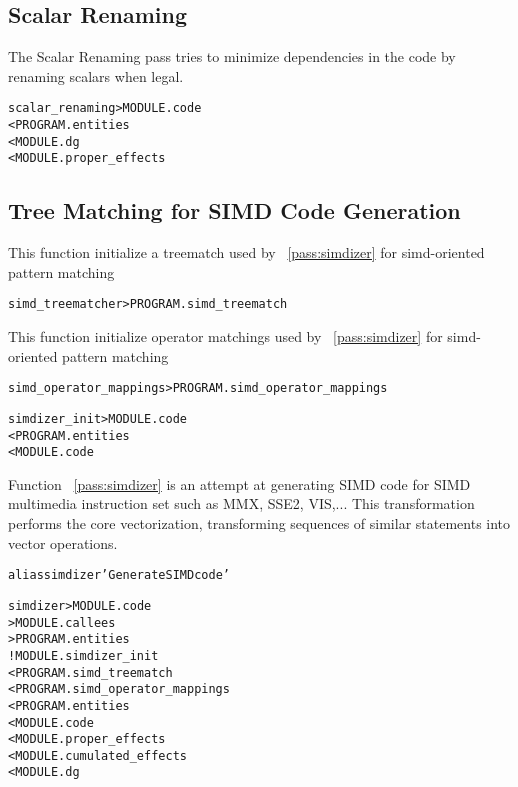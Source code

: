 \documentclass[a4paper]{report}
\newenvironment{PipsMake}{\begin{alltt}}{\end{alltt}}
\newcommand{\PipsPassRef}[1]{\texttt{\detokenize{#1}}~\ref{pass:#1}}
\newenvironment{PipsPass}[1]{\label{pass:#1}}{}
\begin{document}
\subsection{Scalar Renaming}

\begin{PipsPass}{scalar_renaming}
The Scalar Renaming pass tries to minimize dependencies in the code by
renaming scalars when legal.
\end{PipsPass}

\begin{PipsMake}
scalar_renaming           > MODULE.code
        < PROGRAM.entities
        < MODULE.dg
        < MODULE.proper_effects
\end{PipsMake}

\subsection{Tree Matching for SIMD Code Generation}

\begin{PipsPass}{simd_treematcher}
This function initialize a treematch used by \PipsPassRef{simdizer} for simd-oriented pattern matching
\end{PipsPass}
\begin{PipsMake}
simd_treematcher > PROGRAM.simd_treematch
\end{PipsMake}
\begin{PipsPass}{simd_operator_mappings}
This function initialize operator matchings used by \PipsPassRef{simdizer} for simd-oriented pattern matching
\end{PipsPass}
\begin{PipsMake}
simd_operator_mappings > PROGRAM.simd_operator_mappings
\end{PipsMake}

\begin{PipsMake}
simdizer_init  > MODULE.code
	< PROGRAM.entities
	< MODULE.code
\end{PipsMake}

\begin{PipsPass}{simdizer}
Function \PipsPassRef{simdizer} is an attempt at generating SIMD code for SIMD
multimedia instruction set such as MMX, SSE2, VIS,... This
transformation performs the core vectorization, transforming sequences
of similar statements into vector operations.
\end{PipsPass}

\begin{PipsMake}
alias simdizer 'Generate SIMD code'

simdizer                    > MODULE.code
                            > MODULE.callees
                            > PROGRAM.entities
		! MODULE.simdizer_init
		< PROGRAM.simd_treematch
		< PROGRAM.simd_operator_mappings
        < PROGRAM.entities
        < MODULE.code
        < MODULE.proper_effects
        < MODULE.cumulated_effects
        < MODULE.dg
\end{PipsMake}
\end{document}
